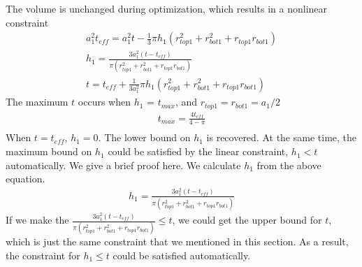 \documentclass[12pt]{article}
\numberwithin{equation}{section}
\numberwithin{equation}{section}
\begin{document}
The volume is unchanged during optimization, which results in a nonlinear constraint
\begin{align}
 a_{1}^2t_{eff} =a_{1}^2t - \frac{1}{3}\pi h_1(r_{top1}^2+r_{bot1}^2+r_{top1}r_{bot1})\nonumber \\
 h_1 = \frac{3a_{1}^2(t - t_{eff} )}{\pi(r_{top1}^2+r_{bot1}^2+r_{top1}r_{bot1})} \nonumber \\
 t = t_{eff} + \frac {1}{3a_1^2} \pi h_1(r_{top1}^2+r_{bot1}^2+r_{top1}r_{bot1})
 \end{align}
The maximum $t$ occurs when $h_1$ = $t_{max}$, and $r_{top1} = r_{bot1} = a_1/2$
\begin{align*}
t_{max} = \frac {4t_{eff}}{4-\pi} \\
\end{align*}
When $t = t_{eff}$, $h_1 = 0$.  The lower bound on $h_1$ is recovered. At the same time, the maximum bound on $h_1$ could be satisfied by the linear constraint, $h_1 < t$ automatically. We give a brief proof here. We calculate $h_1$ from the above equation.
\begin{align*}
h_1 = \frac{3a_{1}^2(t - t_{eff} )}{\pi(r_{top1}^2+r_{bot1}^2+r_{top1}r_{bot1})} 
\end{align*}
If we make the $\frac{3a_{1}^2(t - t_{eff} )}{\pi(r_{top1}^2+r_{bot1}^2+r_{top1}r_{bot1})} \leq t$, we could get the upper bound for $t$, which is just the same constraint that we mentioned in this section. As a result, the constraint for $h_{1} \leq t$ could be satisfied automatically.
\end{document}
